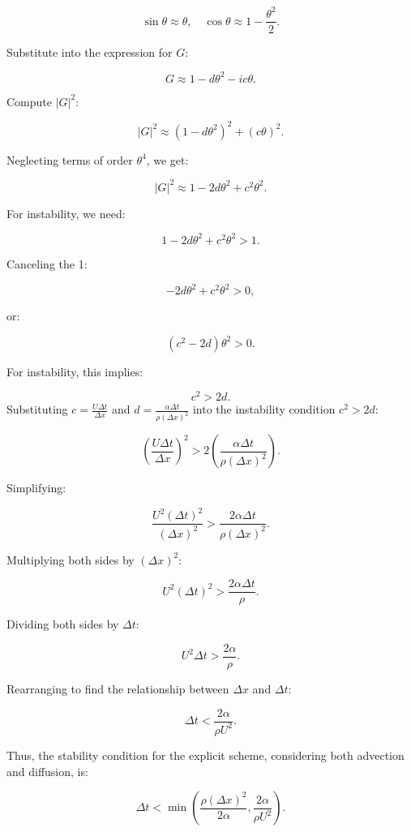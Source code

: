 \documentclass{article}
\begin{document}
\begin{enumerate}
  \[
  \sin \theta \approx \theta, \quad \cos \theta \approx 1 - \frac{\theta^2}{2}.
  \]

  Substitute into the expression for \( G \):

  \[
  G \approx 1 - d \theta^2 - i c \theta.
  \]

  Compute \( |G|^2 \):

  \[
  |G|^2 \approx (1 - d \theta^2)^2 + (c \theta)^2.
  \]

  Neglecting terms of order \( \theta^4 \), we get:

  \[
  |G|^2 \approx 1 - 2d \theta^2 + c^2 \theta^2.
  \]

  For instability, we need:

  \[
  1 - 2d \theta^2 + c^2 \theta^2 > 1.
  \]

  Canceling the 1:

  \[
  -2d \theta^2 + c^2 \theta^2 > 0,
  \]

  or:

  \[
  (c^2 - 2d) \theta^2 > 0.
  \]

  For instability, this implies:

  \[
  c^2 > 2d.
  \]
  Substituting \( c = \frac{U \Delta t}{\Delta x} \) and \( d = \frac{\alpha \Delta t}{\rho (\Delta x)^2} \) into the instability condition \( c^2 > 2d \):

  \[
  \left( \frac{U \Delta t}{\Delta x} \right)^2 > 2 \left( \frac{\alpha \Delta t}{\rho (\Delta x)^2} \right).
  \]

  Simplifying:

  \[
  \frac{U^2 (\Delta t)^2}{(\Delta x)^2} > \frac{2 \alpha \Delta t}{\rho (\Delta x)^2}.
  \]

  Multiplying both sides by \( (\Delta x)^2 \):

  \[
  U^2 (\Delta t)^2 > \frac{2 \alpha \Delta t}{\rho}.
  \]

  Dividing both sides by \( \Delta t \):

  \[
  U^2 \Delta t > \frac{2 \alpha}{\rho}.
  \]

  Rearranging to find the relationship between \( \Delta x \) and \( \Delta t \):

  \[
  \Delta t < \frac{2 \alpha}{\rho U^2}.
  \]

  Thus, the stability condition for the explicit scheme, considering both advection and diffusion, is:

  \[
  \Delta t < \min \left( \frac{\rho (\Delta x)^2}{2 \alpha}, \frac{2 \alpha}{\rho U^2} \right).
  \]
\end{enumerate}
\end{document}
